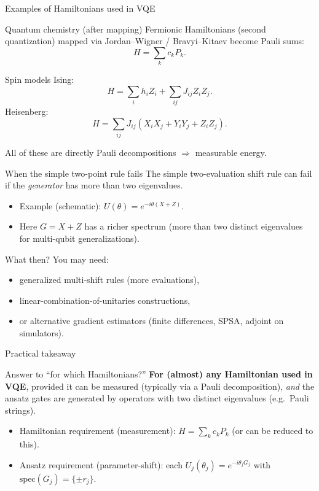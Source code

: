 \documentclass[aspectratio=169]{beamer}
\begin{document}
\begin{frame}{Examples of Hamiltonians used in VQE}
\begin{block}{Quantum chemistry (after mapping)}
Fermionic Hamiltonians (second quantization) mapped via Jordan--Wigner / Bravyi--Kitaev become Pauli sums:
\[
H=\sum_k c_k P_k.
\]
\end{block}

\begin{block}{Spin models}
Ising:
\[
H=\sum_i h_i Z_i + \sum_{ij} J_{ij} Z_iZ_j.
\]
Heisenberg:
\[
H=\sum_{ij} J_{ij}\left(X_iX_j+Y_iY_j+Z_iZ_j\right).
\]
\end{block}
All of these are directly Pauli decompositions $\Rightarrow$ measurable energy.
\end{frame}

\begin{frame}{When the simple two-point rule fails}
The simple two-evaluation shift rule can fail if the \emph{generator} has more than two eigenvalues.
\begin{itemize}
\item Example (schematic): $U(\theta)=e^{-i\theta(X+Z)}$.
\item Here $G=X+Z$ has a richer spectrum (more than two distinct eigenvalues for multi-qubit generalizations).
\end{itemize}

\begin{block}{What then?}
You may need:
\begin{itemize}
\item generalized multi-shift rules (more evaluations),
\item linear-combination-of-unitaries constructions,
\item or alternative gradient estimators (finite differences, SPSA, adjoint on simulators).
\end{itemize}
\end{block}
\end{frame}

\begin{frame}{Practical takeaway}
\begin{block}{Answer to ``for which Hamiltonians?''}
\textbf{For (almost) any Hamiltonian used in VQE}, provided it can be measured (typically via a Pauli decomposition),
\emph{and} the ansatz gates are generated by operators with two distinct eigenvalues (e.g.\ Pauli strings).
\end{block}

\begin{itemize}
\item Hamiltonian requirement (measurement): $H=\sum_k c_k P_k$ (or can be reduced to this).
\item Ansatz requirement (parameter-shift): each $U_j(\theta_j)=e^{-i\theta_j G_j}$ with $\mathrm{spec}(G_j)=\{\pm r_j\}$.
\end{itemize}
\end{frame}
\end{document}
